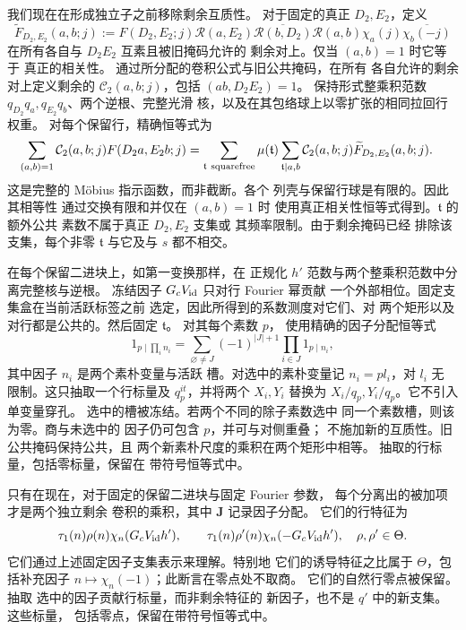 我们现在在形成独立子之前移除剩余互质性。
对于固定的真正 \(D_2,E_2\)，定义
\[
 \widetilde F_{D_2,E_2}(a,b;j)
 :=F(D_2,E_2;j)\mathcal R(a,E_2)
   \overline{\mathcal R(b,D_2)}\mathcal R(a,b)
   \chi_a(j)\overline{\chi_b(-j)}
\]
在所有各自与 \(D_2E_2\) 互素且被旧掩码允许的
剩余对上。仅当 \((a,b)=1\) 时它等于
真正的相关性。
通过所分配的卷积公式与旧公共掩码，在所有
各自允许的剩余对上定义剩余的
\(\mathcal C_2(a,b;j)\)，包括 \((ab,D_2E_2)=1\)。
保持形式整乘积范数
\(q_{D_2}q_a,q_{E_2}q_b\)、两个逆根、完整光滑
核，以及在其包络球上以零扩张的相同拉回行权重。
对每个保留行，精确恒等式为
\[
 \begin{split}
 \sum_{(a,b)=1}\mathcal C_2(a,b;j)F(D_2a,E_2b;j)
 &=\sum_{\mathfrak t\ {\rm squarefree}}\mu(\mathfrak t)
   \sum_{\mathfrak t\mid a,b}\mathcal C_2(a,b;j)
                \widetilde F_{D_2,E_2}(a,b;j).
 \end{split}
\]
这是完整的 M\"obius 指示函数，而非截断。各个
列壳与保留行球是有限的。因此其相等性
通过交换有限和并仅在 \((a,b)=1\) 时
使用真正相关性恒等式得到。\(\mathfrak t\) 的额外公共
素数不属于真正 \(D_2,E_2\) 支集或
其频率限制。由于剩余掩码已经
排除该支集，每个非零 \(\mathfrak t\) 与它及与
\(s\) 都不相交。

在每个保留二进块上，如第一变换那样，在
正规化 \(h'\) 范数与两个整乘积范数中分离完整核与逆根。
冻结因子 \(G_cV_{\rm id}\) 只对行 Fourier 幂贡献
一个外部相位。固定支集盒在当前活跃标签之前
选定，因此所得到的系数测度对它们、对
两个矩形以及对行都是公共的。然后固定 \(\mathfrak t\)。
对其每个素数 \(p\)，
使用精确的因子分配恒等式
\[
 1_{p\mid\prod_i n_i}
 =\sum_{\varnothing\ne J}(-1)^{|J|+1}
       \prod_{i\in J}1_{p\mid n_i},
\]
其中因子 \(n_i\) 是两个素朴变量与活跃
槽。对选中的素朴变量记 \(n_i=pl_i\)，对 \(l_i\) 无
限制。这只抽取一个行标量及
\(q_p^{it}\)，并将两个 \(X_i,Y_i\) 替换为
\(X_i/q_p,Y_i/q_p\)。它不引入单变量穿孔。
选中的槽被冻结。若两个不同的除子素数选中
同一个素数槽，则该为零。商与未选中的
因子仍可包含 \(p\)，并可与对侧重叠；
不施加新的互质性。旧公共掩码保持公共，且
两个新素朴尺度的乘积在两个矩形中相等。
抽取的行标量，包括零标量，保留在
带符号恒等式中。

只有在现在，对于固定的保留二进块与固定 Fourier 参数，
每个分离出的被加项才是两个独立剩余
卷积的乘积，其中 \(\mathbf J\) 记录因子分配。
它们的行特征为
\[
 \tau_1(n)\rho(n)\chi_n(G_cV_{\rm id}h'),\qquad
 \tau_1(n)\rho'(n)\chi_n(-G_cV_{\rm id}h'),
 \quad \rho,\rho'\in\Theta.
\]
它们通过上述固定因子支集表示来理解。特别地
它们的诱导特征之比属于 \(\Theta\)，包括补充因子
\(n\mapsto\chi_n(-1)\)；此断言在零点处不取商。
它们的自然行零点被保留。抽取
选中的因子贡献行标量，而非剩余特征的
新因子，也不是 \(q'\) 中的新支集。这些标量，
包括零点，保留在带符号恒等式中。

